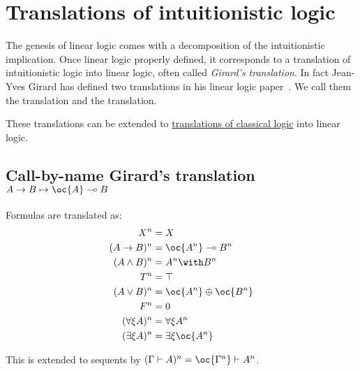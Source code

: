 \allowdisplaybreaks

\chapter{Translations of intuitionistic logic}\label{translations-of-intuitionistic-logic}

The genesis of linear logic comes with a decomposition of the
intuitionistic implication. Once linear logic properly defined, it
corresponds to a translation of intuitionistic logic into linear logic,
often called \emph{Girard's translation}. In fact Jean-Yves Girard has
defined two translations in his linear logic paper~\cite{linearlogic}. We call them the  translation and the  translation.

These translations can be extended to \hyperref[translations-of-classical-logic]{translations of classical logic} into linear logic.

\section{\texorpdfstring{Call-by-name Girard's translation \(A\imp B \mapsto \oc{A}\limp B\)}{Call-by-name Girard's translation A\textbackslash{}imp B \textbackslash{}mapsto \textbackslash{}oc\{A\}\textbackslash{}limp B}}\label{call-by-name-girards-translation-aimp-b-mapsto-ocalimp-b}

Formulas are translated as:
\begin{align*}
X^n &  =  X \\
(A\imp B)^n &  = \oc{A^n}\limp B^n \\
(A\wedge B)^n &  = A^n \with B^n \\
T^n & = \top \\
(A\vee B)^n & = \oc{A^n}\plus\oc{B^n} \\
F^n & = \zero \\
(\forall\xi A)^n & = \forall\xi A^n \\
(\exists\xi A)^n & = \exists\xi \oc{A^n}
\end{align*}

This is extended to sequents by
\((\Gamma\vdash A)^n = \oc{\Gamma^n}\vdash A^n\).


